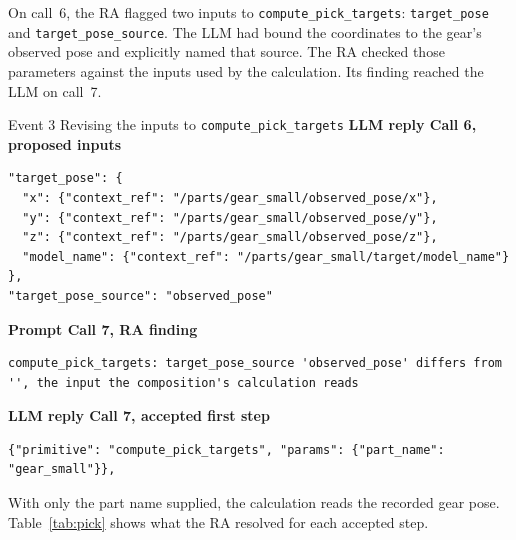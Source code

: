 \documentclass[preprint,12pt,authoryear]{elsarticle}
\let\code\nolinkurl
\begin{document}
On call~6, the RA flagged two inputs to \code{compute_pick_targets}:
\code{target_pose} and \code{target_pose_source}. The LLM had bound the coordinates to the gear's observed pose and explicitly
named that source. The RA checked those parameters against the inputs used by
the calculation. Its finding reached the LLM on call~7.

\begin{recordbox}{Event 3 \enspace Revising the inputs to \code{compute_pick_targets}}
{\small\bfseries LLM reply \enspace Call 6, proposed inputs}\par\smallskip
\begin{lstlisting}
"target_pose": {
  "x": {"context_ref": "/parts/gear_small/observed_pose/x"},
  "y": {"context_ref": "/parts/gear_small/observed_pose/y"},
  "z": {"context_ref": "/parts/gear_small/observed_pose/z"},
  "model_name": {"context_ref": "/parts/gear_small/target/model_name"}
},
"target_pose_source": "observed_pose"
\end{lstlisting}
\par\medskip
{\small\bfseries Prompt \enspace Call 7, RA finding}\par\smallskip
\begin{lstlisting}
compute_pick_targets: target_pose_source 'observed_pose' differs from '', the input the composition's calculation reads
\end{lstlisting}
\par\medskip
{\small\bfseries LLM reply \enspace Call 7, accepted first step}\par\smallskip
\begin{lstlisting}
{"primitive": "compute_pick_targets", "params": {"part_name": "gear_small"}},
\end{lstlisting}
\end{recordbox}

With only the part name supplied, the calculation reads the recorded gear pose.
Table~\ref{tab:pick} shows what the RA resolved for each accepted step.
\end{document}
